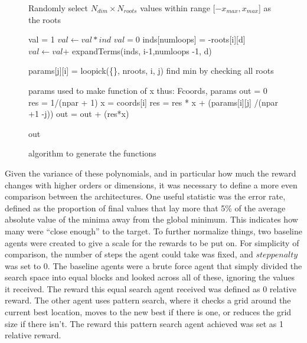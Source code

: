 \begin{figure}
\begin{algorithmic}
\State Randomly select  $N_{dim}\times N_{roots}$ values within range [$-x_{max}, x_{max}$] as the roots

               \State val = 1
                    \State$ val \gets val*ind$
                \EndFor
               \State {}
            \Else
                \State $val = 0$
                    \State inds[numloops] = -roots[i][d]  
                    \State$ val \gets val $+ expandTerms(inds, i-1,numloops -1, d) 
                \EndFor
                \State {}
            \EndIf
      \EndFunction
        
            \State params[j][i] = loopick(\{\}, nroots, i, j)
        \EndFor
    \EndFor
   \State find min by checking all roots
    
  \State params used to make function of x thus:
  \Function F{coords, params}
    \State out = 0
         \State res = 1/(npar + 1) 
        \State x = coords[i]
              \State res = res * x + (params[i][j] /(npar +1 -j))
	    \EndFor
	   \State out =  out + (res*x)
    \EndFor

    \Return out
\EndFunction
\end{algorithmic}
\caption{algorithm to generate the functions}
\label{alg:functiongen}
\end{figure}

Given the variance of these polynomials, and in particular how much the reward changes with higher orders or dimensions, it was necessary to define a more even comparison between the architectures. One useful statistic was the error rate, defined as the proportion of final values that lay more that 5\% of the average absolute value of the minima away from the global minimum. This indicates how many were ``close enough'' to the target. To further normalize things, two baseline agents were created to give a scale for the rewards to be put on. For simplicity of comparison, the number of steps the agent could take was fixed, and $steppenalty$ was set to 0. The baseline agents were a brute force agent that simply divided the search space into equal blocks and looked across all of these, ignoring the values it received. The reward this equal search agent received was defined as 0 relative reward. The other agent uses pattern search, where it checks a grid around the current best location, moves to the new best if there is one, or reduces the grid size if there isn't. The reward this pattern search agent achieved was set as 1 relative reward.


